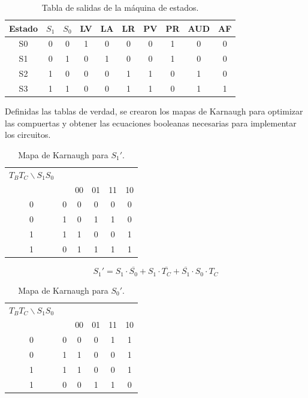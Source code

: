 \documentclass[12pt,onecolumn]{IEEEtran}
\begin{document}
\begin{table}[H]
\centering
\caption{Tabla de salidas de la máquina de estados.}
\label{tab:salidas}
\begin{tabular}{c c c c c c c c c c}
\hline
Estado & $S_1$ & $S_0$ & LV & LA & LR & PV & PR & AUD & AF \\
\hline
S0 & 0 & 0 & 1 & 0 & 0 & 0 & 1 & 0 & 0 \\
S1 & 0 & 1 & 0 & 1 & 0 & 0 & 1 & 0 & 0 \\
S2 & 1 & 0 & 0 & 0 & 1 & 1 & 0 & 1 & 0 \\
S3 & 1 & 1 & 0 & 0 & 1 & 1 & 0 & 1 & 1 \\
\hline
\end{tabular}
\end{table}


Definidas las tablas de verdad, se crearon los mapas de Karnaugh
para optimizar las compuertas y obtener las ecuaciones booleanas
necesarias para implementar los circuitos.

\begin{table}[H]
\centering
\caption{Mapa de Karnaugh para $S_1'$.}
\label{tab:kmap_s1}
\begin{tabular}{cc|cccc}
\hline
$T_B T_C \backslash S_1 S_0$\\
 & & 00 & 01 & 11 & 10 \\
\hline
0 & 0 & 0 & 0 & 0 & 0 \\
0 & 1 & 0 & 1 & 1 & 0 \\
1 & 1 & 1 & 0 & 0 & 1 \\
1 & 0 & 1 & 1 & 1 & 1 \\
\hline
\end{tabular}
\end{table}

\begin{equation}
S_1' = S_1 \cdot \overline{S_0}
     + S_1 \cdot \overline{T_C}
     + \overline{S_1} \cdot S_0 \cdot T_C
\label{eq:s1_next}
\end{equation}

\begin{table}[H]
\centering
\caption{Mapa de Karnaugh para $S_0'$.}
\label{tab:kmap_s0}
\begin{tabular}{cc|cccc}
\hline
$T_B T_C \backslash S_1 S_0$\\
 & & 00 & 01 & 11 & 10 \\
\hline
0 & 0 & 0 & 0 & 1 & 1 \\
0 & 1 & 1 & 0 & 0 & 1 \\
1 & 1 & 1 & 0 & 0 & 1 \\
1 & 0 & 0 & 1 & 1 & 0 \\
\hline
\end{tabular}
\end{table}
\end{document}
